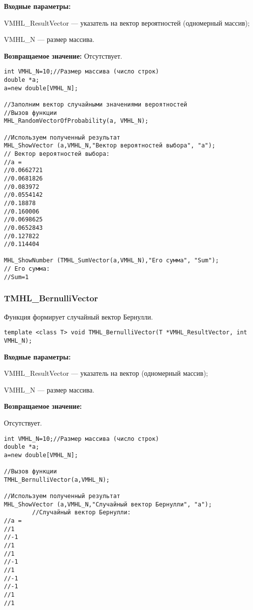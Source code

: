 \documentclass[a4paper,12pt]{article}
\begin{document}
\textbf{Входные параметры:}

 VMHL\_ResultVector --- указатель на вектор вероятностей (одномерный массив);
 
 VMHL\_N --- размер массива.

\textbf{Возвращаемое значение:}
Отсутствует.


\begin{lstlisting}[label=code_use_MHL_RandomVectorOfProbability,caption=Пример использования]
int VMHL_N=10;//Размер массива (число строк)
double *a;
a=new double[VMHL_N];

//Заполним вектор случайными значениями вероятностей
//Вызов функции
MHL_RandomVectorOfProbability(a, VMHL_N);

//Используем полученный результат
MHL_ShowVector (a,VMHL_N,"Вектор вероятностей выбора", "a");
// Вектор вероятностей выбора:
//a =	
//0.0662721
//0.0681826
//0.083972
//0.0554142
//0.18878
//0.160006
//0.0698625
//0.0652843
//0.127822
//0.114404         

MHL_ShowNumber (TMHL_SumVector(a,VMHL_N),"Его сумма", "Sum");
// Его сумма:
//Sum=1
\end{lstlisting}

\subsubsection{TMHL\_BernulliVector}\label{TMHL_BernulliVector}

Функция формирует случайный вектор Бернулли.


\begin{lstlisting}[label=code_syntax_TMHL_BernulliVector,caption=Синтаксис]
template <class T> void TMHL_BernulliVector(T *VMHL_ResultVector, int VMHL_N);
\end{lstlisting}

\textbf{Входные параметры:} 
 
VMHL\_ResultVector --- указатель на вектор (одномерный массив);
 
VMHL\_N --- размер массива.

\textbf{Возвращаемое значение:}

Отсутствует.


\begin{lstlisting}[label=code_use_TMHL_BernulliVector,caption=Пример использования]
int VMHL_N=10;//Размер массива (число строк)
double *a;
a=new double[VMHL_N];

//Вызов функции
TMHL_BernulliVector(a,VMHL_N);

//Используем полученный результат
MHL_ShowVector (a,VMHL_N,"Случайный вектор Бернулли", "a");
		//Случайный вектор Бернулли:
//a =
//1
//-1
//1
//1
//-1
//1
//-1
//-1
//1
//1
\end{lstlisting}
\end{document}

